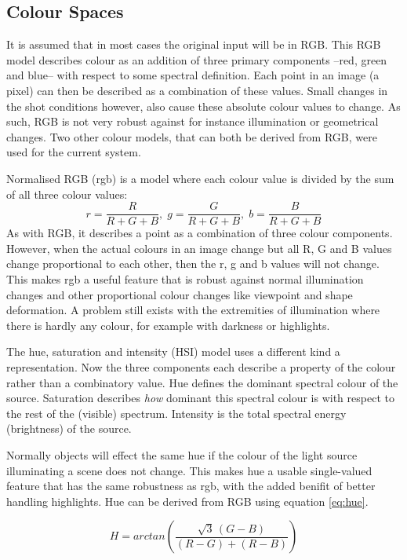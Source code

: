 \documentclass[a4paper,11pt]{article}
\begin{document}
\subsection{Colour Spaces}
\label{sec:theory:colour}
It is assumed that in most cases the original input will be in RGB.
This RGB model describes colour as an addition of three primary components --red, green and blue-- with respect to some spectral definition.
Each point in an image (a pixel) can then be described as a combination of these values.
Small changes in the shot conditions however, also cause these absolute colour values to change.
As such, RGB is not very robust against for instance illumination or geometrical changes.
Two other colour models, that can both be derived from RGB, were used for the current system.\cite{surveycolor}

Normalised RGB (rgb) is a model where each colour value is divided by the sum of all three colour values:
\begin{equation}
\label{eq:rgb}
r = \frac{R}{R+G+B},\; g = \frac{G}{R+G+B},\; b = \frac{B}{R+G+B}
\end{equation}
As with RGB, it describes a point as a combination of three colour components.
However, when the actual colours in an image change but all R, G and B values change proportional to each other, then the r, g and b values will not change.
This makes rgb a useful feature that is robust against normal illumination changes and other proportional colour changes like viewpoint and shape deformation.
A problem still exists with the extremities of illumination where there is hardly any colour, for example with darkness or highlights.

The hue, saturation and intensity (HSI) model uses a different kind a representation.
Now the three components each describe a property of the colour rather than a combinatory value.
Hue defines the dominant spectral colour of the source.
Saturation describes \emph{how} dominant this spectral colour is with respect to the rest of the (visible) spectrum.
Intensity is the total spectral energy (brightness) of the source.

Normally objects will effect the same hue if the colour of the light source illuminating a scene does not change.
This makes hue a usable single-valued feature that has the same robustness as rgb, with the added benifit of better handling highlights.
Hue can be derived from RGB using equation \ref{eq:hue}.

\begin{equation}
\label{eq:hue}
H = arctan\left(\frac{\sqrt{3}\,(G-B)}{(R-G)+(R-B)}\right)
\end{equation}
\end{document}
